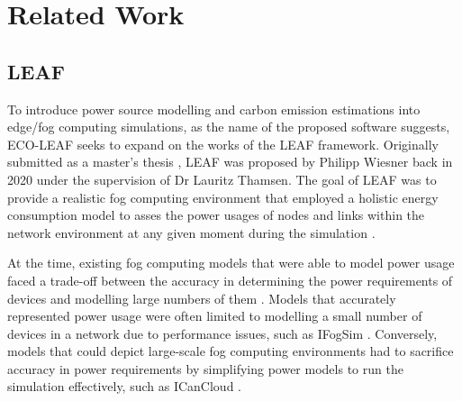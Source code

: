 \documentclass{l4proj}
\begin{document}
\chapter{Related Work}\label{ch:background}
\section{LEAF}\label{leaf}
To introduce power source modelling and carbon emission estimations into edge/fog computing simulations, as the name of the proposed software suggests, ECO-LEAF seeks to expand on the works of the  LEAF framework.
Originally submitted as a master's thesis \citep{leafMasters}, LEAF was proposed by Philipp Wiesner back in 2020 under the supervision of Dr Lauritz Thamsen.
The goal of LEAF was to provide a realistic fog computing environment that employed a holistic energy consumption model to asses the power usages of nodes and links within the network environment at any given moment during the simulation \citep{leafMasters}.

At the time, existing fog computing models that were able to model power usage faced a trade-off between the accuracy in determining the power requirements of devices and modelling large numbers of them \citep{leafMasters}.
Models that accurately represented power usage were often limited to modelling a small number of devices in a network due to performance issues, such as IFogSim \citep{IFOGSIM}.
Conversely, models that could depict large-scale fog computing environments had to sacrifice accuracy in power requirements by simplifying power models to run the simulation effectively, such as ICanCloud \citep{ICanCloud}.
\end{document}
